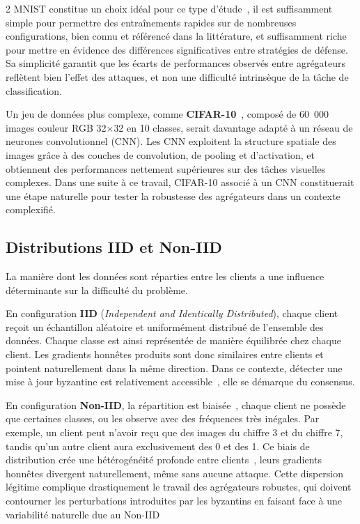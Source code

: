 \documentclass{article}
\begin{document}
\begin{multicols}{2}
MNIST constitue un choix id\'eal pour ce type d'\'etude~, il est suffisamment simple
pour permettre des entra\^inements rapides sur de nombreuses configurations, bien connu
et r\'ef\'erenc\'e dans la litt\'erature, et suffisamment riche pour mettre en \'evidence
des diff\'erences significatives entre strat\'egies de d\'efense. Sa simplicit\'e garantit
que les \'ecarts de performances observ\'es entre agr\'egateurs refl\`etent bien l'effet
des attaques, et non une difficult\'e intrins\`eque de la t\^ache de classification.

Un jeu de donn\'ees plus complexe, comme \textbf{CIFAR-10}~\cite{krizhevsky2009},
compos\'e de 60~000 images couleur RGB 32$\times$32 en 10 classes, serait davantage
adapt\'e \`a un r\'eseau de neurones convolutionnel (CNN). Les CNN exploitent la structure
spatiale des images gr\^ace \`a des couches de convolution, de pooling et d'activation,
et obtiennent des performances nettement sup\'erieures sur des t\^aches visuelles complexes.
Dans une suite \`a ce travail, CIFAR-10 associ\'e \`a un CNN constituerait une \'etape naturelle
pour tester la robustesse des agr\'egateurs dans un contexte complexifié.

\subsection{Distributions IID et Non-IID}

La mani\`ere dont les donn\'ees sont r\'eparties entre les clients a une influence
d\'eterminante sur la difficult\'e du probl\`eme.

En configuration \textbf{IID} (\textit{Independent and Identically Distributed}),
chaque client re\c{c}oit un \'echantillon al\'eatoire et uniform\'ement distribu\'e de
l'ensemble des donn\'ees. Chaque classe est ainsi repr\'esent\'ee de mani\`ere \'equilibr\'ee
chez chaque client. Les gradients honnêtes produits sont donc similaires entre clients
et pointent naturellement dans la m\^eme direction. Dans ce contexte, d\'etecter une
mise \`a jour byzantine est relativement accessible~, elle se d\'emarque du consensus.

En configuration \textbf{Non-IID}, la r\'epartition est biais\'ee~, chaque client
ne poss\`ede que certaines classes, ou les observe avec des fr\'equences tr\`es in\'egales.
Par exemple, un client peut n'avoir re\c{c}u que des images du chiffre 3 et du chiffre 7,
tandis qu'un autre client aura exclusivement des 0 et des 1. Ce biais de distribution
cr\'ee une h\'et\'erog\'en\'eit\'e profonde entre clients~, leurs gradients honnêtes
divergent naturellement, m\^eme sans aucune attaque. Cette dispersion l\'egitime
complique drastiquement le travail des agr\'egateurs robustes, qui doivent contourner les perturbations introduites par les
byzantins en faisant face à une variabilit\'e naturelle due au Non-IID 


\end{multicols}
\end{document}
